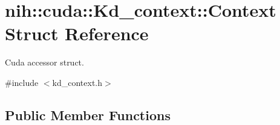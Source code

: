 \hypertarget{structnih_1_1cuda_1_1_kd__context_1_1_context}{
\section{nih\-:\-:cuda\-:\-:\-Kd\-\_\-context\-:\-:\-Context \-Struct \-Reference}
\label{structnih_1_1cuda_1_1_kd__context_1_1_context}
}


\-Cuda accessor struct.  




{\ttfamily \#include $<$kd\-\_\-context.\-h$>$}

\subsection*{\-Public \-Member \-Functions}
